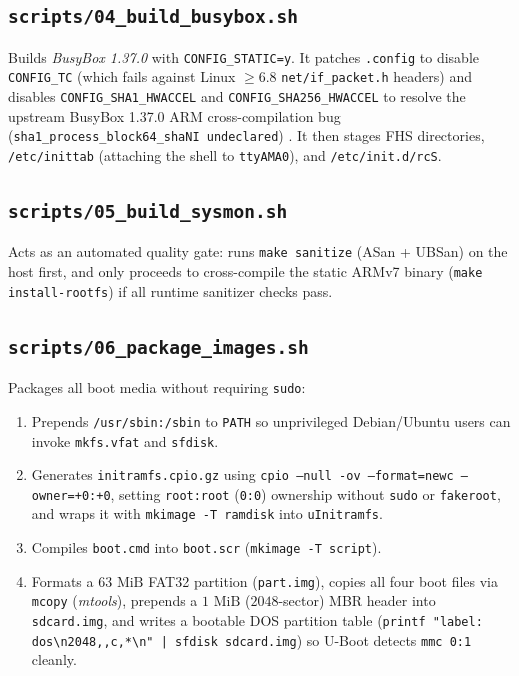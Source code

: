 \documentclass[11pt,a4paper]{article}
\begin{document}
\subsection{\texttt{scripts/04\_build\_busybox.sh}}
Builds \emph{BusyBox 1.37.0} \cite{busybox_site} with \texttt{CONFIG\_STATIC=y}. It patches \texttt{.config} to disable \texttt{CONFIG\_TC} (which fails against Linux $\ge 6.8$ \texttt{net/if\_packet.h} headers) and disables \texttt{CONFIG\_SHA1\_HWACCEL} and \texttt{CONFIG\_SHA256\_HWACCEL} to resolve the upstream BusyBox 1.37.0 ARM cross-compilation bug (\texttt{sha1\_process\_block64\_shaNI undeclared}) \cite{busybox_shani}. It then stages FHS directories, \texttt{/etc/inittab} (attaching the shell to \texttt{ttyAMA0}), and \texttt{/etc/init.d/rcS}.

\subsection{\texttt{scripts/05\_build\_sysmon.sh}}
Acts as an automated quality gate: runs \texttt{make sanitize} (ASan + UBSan) on the host first, and only proceeds to cross-compile the static ARMv7 binary (\texttt{make install-rootfs}) if all runtime sanitizer checks pass.

\subsection{\texttt{scripts/06\_package\_images.sh}}
Packages all boot media without requiring \texttt{sudo}:
\begin{enumerate}
\item Prepends \texttt{/usr/sbin:/sbin} to \texttt{PATH} so unprivileged Debian/Ubuntu users can invoke \texttt{mkfs.vfat} and \texttt{sfdisk}.
\item Generates \texttt{initramfs.cpio.gz} using \texttt{cpio --null -ov --format=newc --owner=+0:+0}, setting \texttt{root:root} (\texttt{0:0}) ownership without \texttt{sudo} or \texttt{fakeroot}, and wraps it with \texttt{mkimage -T ramdisk} into \texttt{uInitramfs}.
\item Compiles \texttt{boot.cmd} into \texttt{boot.scr} (\texttt{mkimage -T script}).
\item Formats a $63\text{ MiB}$ FAT32 partition (\texttt{part.img}), copies all four boot files via \texttt{mcopy} (\emph{mtools}), prepends a $1\text{ MiB}$ ($2048$-sector) MBR header into \texttt{sdcard.img}, and writes a bootable DOS partition table (\texttt{printf "label: dos\textbackslash n2048,,c,*\textbackslash n" | sfdisk sdcard.img}) so U-Boot detects \texttt{mmc 0:1} cleanly.
\end{enumerate}
\end{document}
